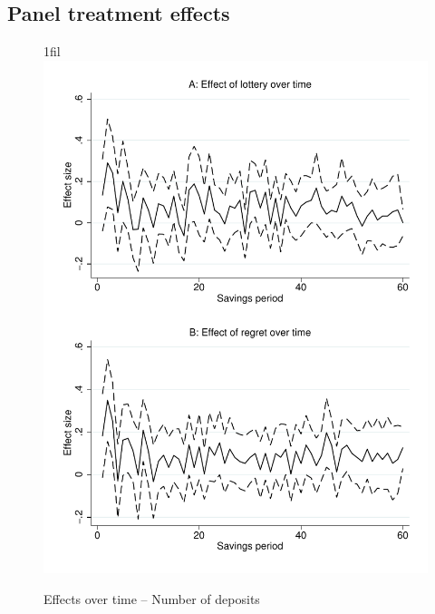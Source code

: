 \documentclass[10pt]{article}
\makeatletter
\newcommand*{\centerfloat}{%
  \parindent \z@
  \leftskip \z@ \@plus 1fil \@minus \textwidth
  \rightskip\leftskip
  \parfillskip \z@skip}
\makeatother
\begin{document}
	\clearpage

	\subsection{Panel treatment effects}

        \begin{figure}[h]
        \centering
        \caption{Effects over time -- Number of deposits}
        \centerfloat
        \includegraphics[width=\textwidth]{../../figures/line-timemobile_deposits.pdf}
        \end{figure}
\end{document}
